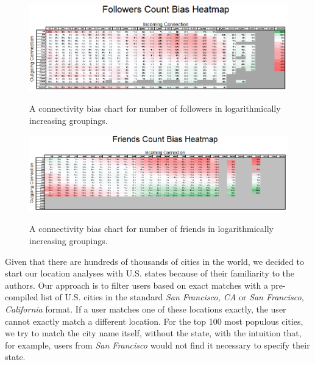 \begin{figure}[t]
 \centering
 \includegraphics[bb=0 0 664 222,scale=.62]{./images/followers_count.png}
 \label{fig:follower_count}
 \caption{A connectivity bias chart for number of followers in logarithmically increasing groupings.}
\end{figure}

\begin{figure}[t]
 \centering
 \includegraphics[bb=0 0 746 221,scale=.55]{./images/friends_count.png}
 \label{fig:friend_count}
 \caption{A connectivity bias chart for number of friends in logarithmically increasing groupings.}
\end{figure}


Given that there are hundreds of thousands of cities in the world, we decided to start our location analyses with U.S. states because of their familiarity to the authors.  Our approach is to filter users based on exact matches with a pre-compiled list of U.S. cities in the standard \textit{San Francisco, CA} or \textit{San Francisco, California} format.  If a user matches one of these locations exactly, the user cannot exactly match a different location.  For the top 100 most populous cities, we try to match the city name itself, without the state, with the intuition that, for example, users from \textit{San Francisco} would not find it necessary to specify their state.

